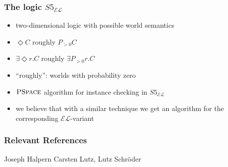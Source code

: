 \documentclass[draft]{beamer}
\newcommand{\el}{\ensuremath{\mathcal{EL}}\xspace}
\newcommand{\pspace}{\ensuremath{\textsc{PSpace}}\xspace}
\begin{document}
\begin{frame}
  \frametitle{The logic $S5_{\el}$}
  \begin{itemize}
    \item two-dimensional logic with possible world semantics
    \item $\Diamond C$ roughly $P_{>0}C$
    \item $\exists\Diamond r.C$ roughly $\exists P_{>0}r.C$
    \item ``roughly'': worlds with probability zero
    \item \pspace algorithm for instance checking in $S5_{\el}$
    \item we believe that with a similar technique we get an algorithm for the corresponding \el-variant
  \end{itemize}
\end{frame}
\begin{frame}
  \frametitle{Relevant References}
  \begin{scriptsize}
    \begin{thebibliography}{xxxxxxxxxxxxxxxxxxxxxxxxxx}
	Joseph Halpern
	Carsten Lutz, Lutz Schr\"oder
    \end{thebibliography}
  \end{scriptsize}
\end{frame}
\end{document}
